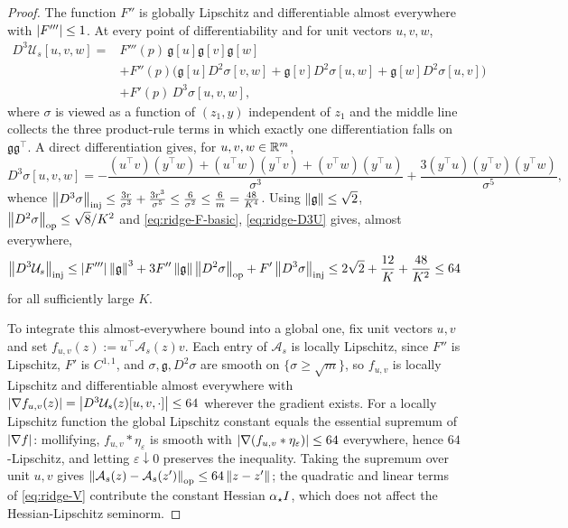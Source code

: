 \begin{proof}
The function $F''$ is globally Lipschitz and differentiable almost everywhere with
$\left\lvert F'''\right\rvert\leq1$. At every point of differentiability and for unit vectors $u,v,w$,
\begin{equation}
\label{eq:ridge-D3U}
\begin{aligned}
    D^3\mathcal U_s[u,v,w]
    ={}&F'''(p)\,\mathfrak g[u]\mathfrak g[v]\mathfrak g[w]\\
    &+F''(p)\bigl(\mathfrak g[u]D^2\sigma[v,w]+\mathfrak g[v]D^2\sigma[u,w]+\mathfrak g[w]D^2\sigma[u,v]\bigr)\\
    &+F'(p)\,D^3\sigma[u,v,w],
\end{aligned}
\end{equation}
where $\sigma$ is viewed as a function of $(z_1,y)$ independent of $z_1$ and the middle line
collects the three product-rule terms in which exactly one differentiation falls on
$\mathfrak g\mathfrak g^\top$. A direct differentiation gives, for $u,v,w\in\mathbb{R}^m$,
\[
    D^3\sigma[u,v,w]
    =-\frac{(u^\top v)(y^\top w)+(u^\top w)(y^\top v)+(v^\top w)(y^\top u)}{\sigma^3}
    +\frac{3(y^\top u)(y^\top v)(y^\top w)}{\sigma^5},
\]
whence
$\left\lVert D^3\sigma\right\rVert_{\mathrm{inj}}\leq\tfrac{3r}{\sigma^3}+\tfrac{3r^3}{\sigma^5}\leq\tfrac6{\sigma^2}\leq\tfrac6m=\tfrac{48}{K^4}$.
Using $\left\lVert \mathfrak g\right\rVert\leq\sqrt2$, $\left\lVert D^2\sigma\right\rVert_{\mathrm{op}}\leq\sqrt8/K^2$ and
\eqref{eq:ridge-F-basic}, \eqref{eq:ridge-D3U} gives, almost everywhere,
\[
    \left\lVert D^3\mathcal U_s\right\rVert_{\mathrm{inj}}
    \leq\left\lvert F'''\right\rvert\left\lVert \mathfrak g\right\rVert^3+3F''\left\lVert \mathfrak g\right\rVert\left\lVert D^2\sigma\right\rVert_{\mathrm{op}}+F'\left\lVert D^3\sigma\right\rVert_{\mathrm{inj}}
    \leq2\sqrt2+\frac{12}K+\frac{48}{K^2}\leq64
\]
for all sufficiently large $K$.

To integrate this almost-everywhere bound into a global one, fix unit vectors $u,v$ and set
$f_{u,v}(z):=u^\top\mathcal A_s(z)v$. Each entry of $\mathcal A_s$ is locally Lipschitz, since
$F''$ is Lipschitz, $F'$ is $C^{1,1}$, and $\sigma,\mathfrak g,D^2\sigma$ are smooth on
$\{\sigma\geq\sqrt m\}$, so $f_{u,v}$ is locally Lipschitz and differentiable almost everywhere
with $\left\lvert \nabla f_{u,v}(z)\right\rvert=\left\lvert D^3\mathcal U_s(z)[u,v,\cdot]\right\rvert\leq64$ wherever the gradient
exists. For a locally Lipschitz function the global Lipschitz constant equals the essential
supremum of $\left\lvert \nabla f\right\rvert$: mollifying, $f_{u,v}*\eta_\varepsilon$ is smooth with
$\left\lvert \nabla(f_{u,v}*\eta_\varepsilon)\right\rvert\leq64$ everywhere, hence $64$-Lipschitz, and letting
$\varepsilon\downarrow0$ preserves the inequality. Taking the supremum over unit $u,v$ gives
$\left\lVert \mathcal A_s(z)-\mathcal A_s(z')\right\rVert_{\mathrm{op}}\leq64\left\lVert z-z'\right\rVert$; the quadratic and linear terms
of \eqref{eq:ridge-V} contribute the constant Hessian $\alpha_\star I$, which does not affect
the Hessian-Lipschitz seminorm.
\end{proof}

